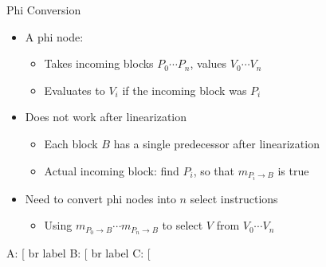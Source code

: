 \begin{frame}[fragile]{Phi Conversion}

\begin{itemize}
    \item A phi node:
    \begin{itemize}
        \item Takes incoming blocks $P_0 \cdots P_n$, values $V_0 \cdots V_n$
        \item Evaluates to $V_i$ if the incoming block was $P_i$
    \end{itemize}
    \item Does not work after linearization
    \begin{itemize}
        \item Each block $B$ has a single predecessor after linearization
        \item Actual incoming block: find $P_i$, so that $m_{P_i \rightarrow B}$ is true
    \end{itemize}
    \item Need to convert phi nodes into $n$ select instructions
    \begin{itemize}
        \item Using $m_{P_0 \rightarrow B} \cdots m_{P_n \rightarrow B}$ to select $V$ from $V_0 \cdots V_n$
    \end{itemize}
\end{itemize}

\hspace{3.0em}\begin{minipage}[t]{0.40\linewidth}


\begin{codebox}[commandchars=\\\[\]]
A:
  \varying[%
  br label %
B:
  \varying[%
  br label %
C:
  \varying[%
\end{codebox}

\end{minipage}

\end{frame}

